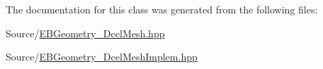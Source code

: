 The documentation for this class was generated from the following files\+:\begin{DoxyCompactItemize}
\item 
Source/\hyperlink{EBGeometry__DcelMesh_8hpp}{E\+B\+Geometry\+\_\+\+Dcel\+Mesh.\+hpp}\item 
Source/\hyperlink{EBGeometry__DcelMeshImplem_8hpp}{E\+B\+Geometry\+\_\+\+Dcel\+Mesh\+Implem.\+hpp}\end{DoxyCompactItemize}
